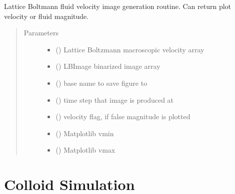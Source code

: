 \documentclass[letterpaper,10pt,english]{sphinxmanual}
\begin{document}
\begin{fulllineitems}
\label{\detokenize{index:lb_colloids.LB.LB_pretty.velocity_image}}
Lattice Boltmann fluid velocity image generation routine. Can return
plot velocity or fluid magnitude.
\begin{quote}\begin{description}
\item[{Parameters}] \leavevmode\begin{itemize}
\item {} 
 () \textendash{} Lattice Boltzmann macroscopic velocity array

\item {} 
 () \textendash{} LBImage binarized image array

\item {} 
 () \textendash{} base name to save figure to

\item {} 
 () \textendash{} time step that image is produced at

\item {} 
 () \textendash{} velocity flag, if false magnitude is plotted

\item {} 
 () \textendash{} Matplotlib vmin

\item {} 
 () \textendash{} Matplotlib vmax

\end{itemize}

\end{description}\end{quote}

\end{fulllineitems}



\chapter{Colloid Simulation}
\label{\detokenize{index:id6}}
\end{document}
